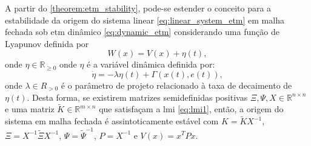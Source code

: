 \begin{corollary}
  \label{corollary:etm_stability} A partir do \autoref{theorem:etm_stability}, pode-se estender o conceito para a estabilidade da origem do sistema linear \eqref{eq:linear_system_etm} em malha fechada sob \acrshort{etm} dinâmico \eqref{eq:dynamic_etm} considerando uma função de Lyapunov definida por \begin{equation}W(x) = V(x) + \eta(t) \label{eq:lyapunov_w},\end{equation} onde $\eta \in \mathbb{R}_{\geq 0}$ onde $\eta$ é a variável dinâmica definida por: \begin{equation}  \dot{\eta} = - \lambda \eta(t) + \Gamma(x(t), e(t)), \label{eq:eta_dynamic}\end{equation} onde $\lambda \in R_{> 0} $ é o parâmetro de projeto relacionado à taxa de decaimento de $\eta(t)$. Desta forma, se existirem matrizes semidefinidas positivas $\Xi, \Psi, X \in \mathbb{R}^{n \times n}$ e uma matriz $\tilde{K} \in \mathbb{R}^{m \times n}$ que satisfaçam a \acrshort{lmi} \eqref{eq:lmi1}, então, a origem do sistema em malha fechada é assintoticamente estável com $K = \tilde{K}X^{-1}$, $\Xi= X^{-1}\tilde{\Xi}X^{-1}$, $\Psi = \tilde{\Psi}^{-1}$, $P = X^{-1}$ e $V(x)=x^TPx$.
\end{corollary}

